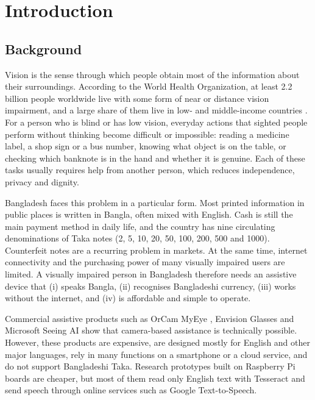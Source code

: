 \clearpage
\chapter{Introduction}
\label{chap:introduction}

\section{Background}
\label{sec:background}
Vision is the sense through which people obtain most of the information about their surroundings. According to the World Health Organization, at least 2.2 billion people worldwide live with some form of near or distance vision impairment, and a large share of them live in low- and middle-income countries \cite{who2023vision, gbd2021vision}. For a person who is blind or has low vision, everyday actions that sighted people perform without thinking become difficult or impossible: reading a medicine label, a shop sign or a bus number, knowing what object is on the table, or checking which banknote is in the hand and whether it is genuine. Each of these tasks usually requires help from another person, which reduces independence, privacy and dignity.

Bangladesh faces this problem in a particular form. Most printed information in public places is written in Bangla, often mixed with English. Cash is still the main payment method in daily life, and the country has nine circulating denominations of Taka notes (2, 5, 10, 20, 50, 100, 200, 500 and 1000). Counterfeit notes are a recurring problem in markets. At the same time, internet connectivity and the purchasing power of many visually impaired users are limited. A visually impaired person in Bangladesh therefore needs an assistive device that (i) speaks Bangla, (ii) recognises Bangladeshi currency, (iii) works without the internet, and (iv) is affordable and simple to operate.

Commercial assistive products such as OrCam MyEye \cite{orcam}, Envision Glasses \cite{envision} and Microsoft Seeing AI \cite{seeingai} show that camera-based assistance is technically possible. However, these products are expensive, are designed mostly for English and other major languages, rely in many functions on a smartphone or a cloud service, and do not support Bangladeshi Taka. Research prototypes built on Raspberry Pi boards \cite{readingaid_rpi2023, visionvoice2024, cameraocr2023} are cheaper, but most of them read only English text with Tesseract and send speech through online services such as Google Text-to-Speech.

